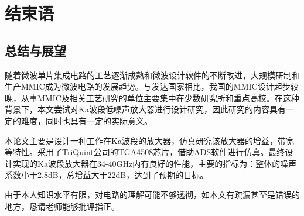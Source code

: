 
\chapter{结束语}

\section{总结与展望}

随着微波单片集成电路的工艺逐渐成熟和微波设计软件的不断改进，大规模研制和生产MMIC成为微波电路的发展趋势。与发达国家相比，我国的MMIC设计起步较晚，从事MMIC及相关工艺研究的单位主要集中在少数研究所和重点高校。在这种背景下，本文尝试对Ka波段低噪声放大器进行设计研究，因此研究的内容具有一定的难度，同时也具有一定的实际意义。 

本论文主要是设计一种工作在Ka波段的放大器，仿真研究该放大器的增益，带宽等特性。采用了TriQuint公司的TGA4508芯片，借助ADS软件进行仿真。最终设计实现的Ka波段放大器在34-40GHz内有良好的性能，主要的指标为：整体的噪声系数小于2.8dB，总增益大于22dB，达到了预期的目标。

由于本人知识水平有限，对电路的理解可能不够透彻，如本文有疏漏甚至是错误的地方，恳请老师能够批评指正。